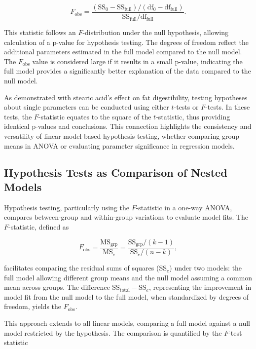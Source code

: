 \documentclass{article}
\begin{document}
\[
F_{\mathrm{obs}} = \frac{(\text{SS}_{0} - \text{SS}_{\text{full}}) / (\text{df}_{0} - \text{df}_{\text{full}})}{\text{SS}_{\text{full}} / \text{df}_{\text{full}}}.
\]

This statistic follows an $F$-distribution under the null hypothesis, allowing calculation of a p-value for hypothesis testing. The degrees of freedom reflect the additional parameters estimated in the full model compared to the null model. The $F_{\mathrm{obs}}$ value is considered large if it results in a small p-value, indicating the full model provides a significantly better explanation of the data compared to the null model.

As demonstrated with stearic acid's effect on fat digestibility, testing hypotheses about single parameters can be conducted using either $t$-tests or $F$-tests. In these tests, the $F$-statistic equates to the square of the $t$-statistic, thus providing identical p-values and conclusions. This connection highlights the consistency and versatility of linear model-based hypothesis testing, whether comparing group means in ANOVA or evaluating parameter significance in regression models.
\subsection{Hypothesis Tests as Comparison of Nested Models}

Hypothesis testing, particularly using the $F$-statistic in a one-way ANOVA, compares between-group and within-group variations to evaluate model fits. The $F$-statistic, defined as

\begin{equation*}
F_{\mathrm{obs}} = \frac{\mathrm{MS}_{\mathrm{grp}}}{\mathrm{MS}_{e}} = \frac{\mathrm{SS}_{\mathrm{grp}} /(k-1)}{\mathrm{SS}_{e} /(n-k)},
\end{equation*}

facilitates comparing the residual sums of squares ($\mathrm{SS}_{e}$) under two models: the full model allowing different group means and the null model assuming a common mean across groups. The difference $\mathrm{SS}_{\text{total}} - \mathrm{SS}_{e}$, representing the improvement in model fit from the null model to the full model, when standardized by degrees of freedom, yields the $F_{\mathrm{obs}}$.

This approach extends to all linear models, comparing a full model against a null model restricted by the hypothesis. The comparison is quantified by the $F$-test statistic
\end{document}
